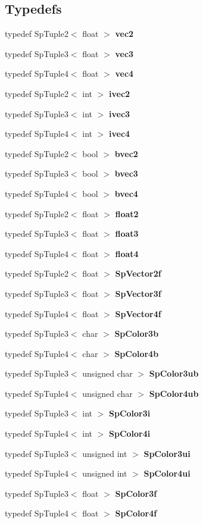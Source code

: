 \subsection*{Typedefs}
\begin{CompactItemize}
\item 
typedef Sp\-Tuple2$<$ float $>$ {\bf vec2}
\item 
typedef Sp\-Tuple3$<$ float $>$ {\bf vec3}
\item 
typedef Sp\-Tuple4$<$ float $>$ {\bf vec4}
\item 
typedef Sp\-Tuple2$<$ int $>$ {\bf ivec2}
\item 
typedef Sp\-Tuple3$<$ int $>$ {\bf ivec3}
\item 
typedef Sp\-Tuple4$<$ int $>$ {\bf ivec4}
\item 
typedef Sp\-Tuple2$<$ bool $>$ {\bf bvec2}
\item 
typedef Sp\-Tuple3$<$ bool $>$ {\bf bvec3}
\item 
typedef Sp\-Tuple4$<$ bool $>$ {\bf bvec4}
\item 
typedef Sp\-Tuple2$<$ float $>$ {\bf float2}
\item 
typedef Sp\-Tuple3$<$ float $>$ {\bf float3}
\item 
typedef Sp\-Tuple4$<$ float $>$ {\bf float4}
\item 
typedef Sp\-Tuple2$<$ float $>$ {\bf Sp\-Vector2f}
\item 
typedef Sp\-Tuple3$<$ float $>$ {\bf Sp\-Vector3f}
\item 
typedef Sp\-Tuple4$<$ float $>$ {\bf Sp\-Vector4f}
\item 
typedef Sp\-Tuple3$<$ char $>$ {\bf Sp\-Color3b}
\item 
typedef Sp\-Tuple4$<$ char $>$ {\bf Sp\-Color4b}
\item 
typedef Sp\-Tuple3$<$ unsigned char $>$ {\bf Sp\-Color3ub}
\item 
typedef Sp\-Tuple4$<$ unsigned char $>$ {\bf Sp\-Color4ub}
\item 
typedef Sp\-Tuple3$<$ int $>$ {\bf Sp\-Color3i}
\item 
typedef Sp\-Tuple4$<$ int $>$ {\bf Sp\-Color4i}
\item 
typedef Sp\-Tuple3$<$ unsigned int $>$ {\bf Sp\-Color3ui}
\item 
typedef Sp\-Tuple4$<$ unsigned int $>$ {\bf Sp\-Color4ui}
\item 
typedef Sp\-Tuple3$<$ float $>$ {\bf Sp\-Color3f}
\item 
typedef Sp\-Tuple4$<$ float $>$ {\bf Sp\-Color4f}
\end{CompactItemize}
